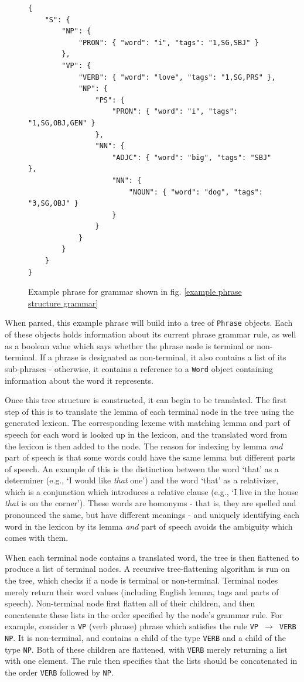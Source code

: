 \documentclass{report}
\begin{document}
	\begin{figure}
	\caption{Example phrase for grammar shown in fig. \ref{example phrase structure grammar}}
	\label{example phrase}
	\begin{tcolorbox}
		\begin{lstlisting}[breaklines=true,tabsize=2]
{
	"S": {
		"NP": {
			"PRON": { "word": "i", "tags": "1,SG,SBJ" }
		},
		"VP": {
			"VERB": { "word": "love", "tags": "1,SG,PRS" },
			"NP": {
				"PS": {
					"PRON": { "word": "i", "tags": "1,SG,OBJ,GEN" }
				},
				"NN": {
					"ADJC": { "word": "big", "tags": "SBJ" },
					"NN": {
						"NOUN": { "word": "dog", "tags": "3,SG,OBJ" }
					}
				}
			}
		}
	}
}
		\end{lstlisting}
	\end{tcolorbox}
	\end{figure}

	When parsed, this example phrase will build into a tree of \texttt{Phrase} objects. Each of these objects holds information about its current phrase grammar rule, as well as a boolean value which says whether the phrase node is terminal or non-terminal. If a phrase is designated as non-terminal, it also contains a list of its sub-phrases - otherwise, it contains a reference to a \texttt{Word} object containing information about the word it represents.
	
	Once this tree structure is constructed, it can begin to be translated. The first step of this is to translate the lemma of each terminal node in the tree using the generated lexicon. The corresponding lexeme with matching lemma and part of speech for each word is looked up in the lexicon, and the translated word from the lexicon is then added to the node. The reason for indexing by lemma \textit{and} part of speech is that some words could have the same lemma but different parts of speech. An example of this is the distinction between the word `that' as a determiner (e.g., `I would like \textit{that} one') and the word `that' as a relativizer, which is a conjunction which introduces a relative clause (e.g., `I live in the house \textit{that} is on the corner'). These words are homonyms - that is, they are spelled and pronounced the same, but have different meanings - and uniquely identifying each word in the lexicon by its lemma \textit{and} part of speech avoids the ambiguity which comes with them.
	
	When each terminal node contains a translated word, the tree is then flattened to produce a list of terminal nodes. A recursive tree-flattening algorithm is run on the tree, which checks if a node is terminal or non-terminal. Terminal nodes merely return their word values (including English lemma, tags and parts of speech). Non-terminal node first flatten all of their children, and then concatenate these lists in the order specified by the node's grammar rule. For example, consider a \texttt{VP} (verb phrase) phrase which satisfies the rule \texttt{VP $\rightarrow$ VERB NP}. It is non-terminal, and contains a child of the type \texttt{VERB} and a child of the type \texttt{NP}. Both of these children are flattened, with \texttt{VERB} merely returning a list with one element. The rule then specifies that the lists should be concatenated in the order \texttt{VERB} followed by \texttt{NP}.
	
\end{document}
